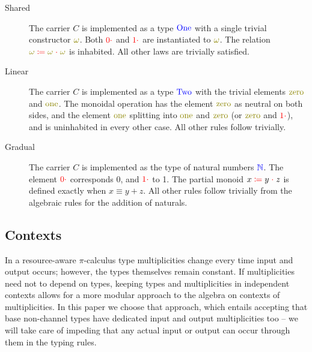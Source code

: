 \documentclass[a4paper,UKenglish,cleveref, autoref, thm-restate,authorcolumns]{lipics-v2019}
\theoremstyle{definition}
\newcommand{\picalc}{$\pi$-calculus}
\newcommand{\type}[1]{\textcolor{blue}{\mathtt{\operatorname{#1}}}}
\newcommand{\constr}[1]{\textcolor{olive}{\mathtt{\operatorname{#1}}}}
\newcommand{\field}[1]{\textcolor{red}{\mathtt{\operatorname{#1}}}}
\newcommand{\op}[3]{#1 \; \field{\coloneqq} \; #2 \; \field{\cdot} \; #3}
\newcommand{\zero}{\field{0\cdot}}
\newcommand{\one}{\field{1\cdot}}
\newcommand{\N}{\type{\mathbb{N}}}
\begin{document}
\begin{description}

\item [Shared]

The carrier $C$ is implemented as a type $\type{One}$ with a single trivial constructor $\constr{\omega}$.
Both $\zero$ and $\one$ are instantiated to $\constr{\omega}$.
The relation $\op{\constr{\omega}}{\constr{\omega}}{\constr{\omega}}$ is inhabited.
All other laws are trivially satisfied.

\item [Linear]

The carrier $C$ is implemented as a type $\type{Two}$ with the trivial elements $\constr{zero}$ and $\constr{one}$.
The monoidal operation has the element $\constr{zero}$ as neutral on both sides, and the element $\constr{one}$ splitting into $\constr{one}$ and $\constr{zero}$ (or $\constr{zero}$ and $\constr{\one}$), and is uninhabited in every other case.
All other rules follow trivially.

\item [Gradual]

The carrier $C$ is implemented as the type of natural numbers $\N$.
The element $\zero$ corresponds 0, and $\one$ to 1.
The partial monoid $\op{x}{y}{z}$ is defined exactly when $x \equiv y + z$.
All other rules follow trivially from the algebraic rules for the addition of naturals.

\end{description}

\subsection{Contexts}

In a resource-aware \picalc{} type multiplicities change every time input and output occurs; however, the types themselves remain constant.
If multiplicities need not to depend on types, keeping types and multiplicities in independent contexts allows for a more modular approach to the algebra on contexts of multiplicities.
In this paper we choose that approach, which entails accepting that base non-channel types have dedicated input and output multiplicities too -- we will take care of impeding that any actual input or output can occur through them in the typing rules.
\end{document}
